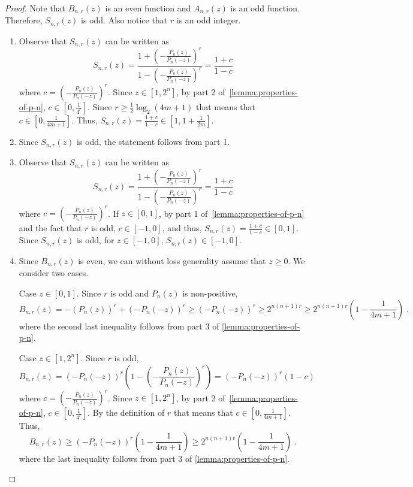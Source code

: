 \documentclass[12pt]{article}
\begin{document}
\begin{proof}
Note that $B_{n,r}(z)$ is an even function and $A_{n,r}(z)$ is an odd function.
Therefore, $S_{n,r}(z)$ is odd. Also notice that $r$ is an odd integer.

\begin{enumerate}
\item Observe that $S_{n,r}(z)$ can be written as
$$
S_{n,r}(z) = \frac{\displaystyle 1 + \left( - \frac{P_n(z)}{P_n(-z)}\right)^r}{\displaystyle 1 - \left( - \frac{P_n(z)}{P_n(-z)}\right)^r} = \frac{1 + c}{1 - c}
$$
where $c = \left( - \frac{P_n(z)}{P_n(-z)}\right)^r$. Since $z \in [1,2^n]$, by
part 2 of~\autoref{lemma:properties-of-p-n}, $c \in [0,\frac{1}{4^r}]$. Since
$r \ge \frac{1}{2} \log_2(4m+1)$ that means that $c \in [0,\frac{1}{4m+1}]$. Thus,
$S_{n,r}(z) = \frac{1+c}{1-c} \in [1,1 + \frac{1}{2m}]$.

\item Since $S_{n,r}(z)$ is odd, the statement follows from part 1.

\item Observe that $S_{n,r}(z)$ can be written as
$$
S_{n,r}(z) = \frac{\displaystyle 1 + \left( - \frac{P_n(z)}{P_n(-z)}\right)^r}{\displaystyle 1 - \left( - \frac{P_n(z)}{P_n(-z)}\right)^r} = \frac{1 + c}{1 - c}
$$
where $c = \left( - \frac{P_n(z)}{P_n(-z)}\right)^r$. If $z \in [0,1]$, by part
1 of~\autoref{lemma:properties-of-p-n} and the fact that $r$ is odd, $c
\in [-1,0]$, and thus, $S_{n,r}(z) = \frac{1+c}{1-c} \in [0,1]$. Since
$S_{n,r}(z)$ is odd, for $z \in [-1,0]$, $S_{n,r}(z) \in [-1,0]$.

\item Since $B_{n,r}(z)$ is even, we can without loss generality assume that $z \ge
0$. We consider two cases.

Case $z \in [0,1]$. Since $r$ is odd and $P_n(z)$ is non-positive,
$$
B_{n,r}(z) = - (P_n(z))^r + \left(- P_{n}(-z)\right)^r \ge \left(- P_{n}(-z)\right)^r \ge 2^{n(n+1)r} \ge 2^{n(n+1)r} \left( 1 - \frac{1}{4m+1} \right) \; .
$$
where the second last inequality follows from part 3 of \autoref{lemma:properties-of-p-n}.

Case $z \in [1,2^n]$. Since $r$ is odd,
$$
B_{n,r}(z) = \left(- P_{n}(-z)\right)^r \left(1 - \left( - \frac{P_n(z)}{P_n(-z)}\right)^r \right) = \left(- P_{n}(-z)\right)^r (1 - c)
$$
where $c = \left( - \frac{P_n(z)}{P_n(-z)}\right)^r$. Since $z \in [1,2^n]$, by
part 2 of~\autoref{lemma:properties-of-p-n}, $c \in [0,\frac{1}{4^r}]$. By
the definition of $r$ that means that $c \in [0,\frac{1}{4m+1}]$. Thus,
$$
B_{n,r}(z) \ge \left(- P_{n}(-z)\right)^r \left( 1 - \frac{1}{4m+1} \right) \ge 2^{n(n+1)r} \left( 1 - \frac{1}{4m+1} \right) \; .
$$
where the last inequality follows from part 3 of \autoref{lemma:properties-of-p-n}.
\end{enumerate}
\end{proof}
\end{document}
